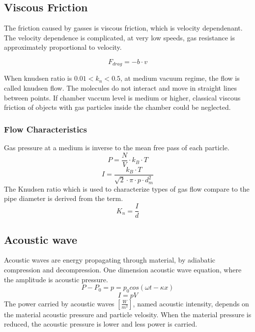 \documentclass[\main/master.tex]{subfiles}
\begin{document}
\subsection{Viscous Friction}
The friction caused by gasses is viscous friction, which is velocity dependenant. The velocity dependence is complicated, at very low speeds, gas resistance is approximately proportional to velocity. 

\begin{equation}
F_{drag} = -b\cdot v  \label{eqn:energy-mass-equivalence-relation}
\end{equation}

When knudsen ratio is $0.01<k_n<0.5$, at medium vacuum regime, the flow is called knudsen flow. The molecules do not interact and move in straight lines between points. If chamber vaccum level is medium or higher, classical viscous friction of objects with gas particles inside the chamber could be neglected.
\subsubsection{Flow Characteristics}
Gas pressure at a medium is inverse to the mean free pass of each particle.     
\begin{equation}
P = \frac{N}{V}\cdot k_B\cdot T  \label{eqn:ideal-gasses}
\end{equation}
\begin{equation}
I = \frac{k_B\cdot T}{\sqrt{2}\cdot\pi\cdot p\cdot d_m^2}     \label{eqn:mean-free-pass}
\end{equation}
 The Knudsen ratio which is used to characterize types of gas flow compare to the pipe diameter is derived from the term.
\begin{equation}
K_n = \frac{I}{d}     \label{eqn:mean-free-pass}
\end{equation}

\subsection{Acoustic wave}
Acoustic waves are energy propagating through material, by adiabatic compression and decompression. One dimension acoustic wave equation, where the amplitude is acoustic pressure.
\begin{equation}
P-P_0 = p = p_0cos(\omega t -\kappa x)       \label{eqn:acoustic_pressure}
\end{equation}
\begin{equation}
I = pV      \label{eqn:acoustic_intensity}
\end{equation} 
The power carried by acoustic waves $[\frac{W}{m^2}]$, named acoustic intensity, depends on the material acoustic pressure and particle velosity. When the material pressure is reduced, the acoustic pressure is lower and less power is carried.
\end{document}
